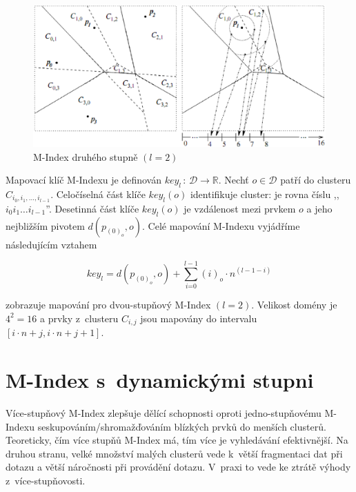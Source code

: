 \begin{figure}[t]
\centering{}\includegraphics[scale=0.5]{m-index-level-two}\caption{M-Index druhého stupně $(l=2)$\label{fig:M-Index-level-two}}
\end{figure}


Mapovací klíč M-Indexu je definován $key_{l}\,:\,\mathcal{D\rightarrow\mathbb{R}}$\@.
Nechť $o\in\mathcal{D}$ patří do clusteru $C_{i_{0},i_{1},\ldots,i_{l-1}}$\@.
Celočíselná část klíče $key_{l}(o)$ identifikuje cluster: je rovna
číslu ,,$i_{0}i_{1}\ldots i_{l-1}$''\@. Desetinná část klíče $key_{l}(o)$
je vzdálenost mezi prvkem $o$ a jeho nejbližším pivotem $d(p_{(0)_{o}},o)$\@.
Celé mapování M-Indexu vyjádříme následujícím vztahem

\begin{equation}
key_{l}=d(p_{(0)_{o}},o)+\sum_{i\text{=0}}^{l-1}(i)_{o}\cdot n{}^{(l-1-i)}\label{eq:M-Index-key}
\end{equation}


zobrazuje mapování pro dvou-stupňový
M-Index $(l=2)$\@. Velikost domény je $4^{2}=16$ a prvky z~clusteru
$C_{i,j}$ jsou mapovány do intervalu $[i\cdot n+j,i\cdot n+j+1]$\@.


\section{M-Index s~dynamickými stupni}

Více-stupňový M-Index zlepšuje dělící schopnosti oproti jedno-stupňovému
M-Indexu seskupováním/shromažďováním blízkých prvků do menších clusterů\@.
Teoreticky, čím více stupňů M-Index má, tím více je vyhledávání efektivnější\@.
Na druhou stranu, velké množství malých clusterů vede k~větší fragmentaci
dat při dotazu a větší náročnosti při provádění dotazu\@. V~praxi
to vede ke ztrátě výhody z~více-stupňovosti\@.


